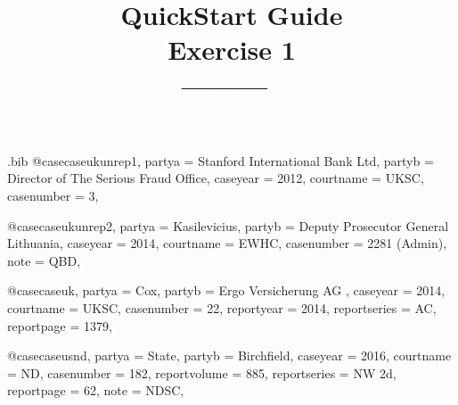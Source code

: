 \begin{filecontents*}[overwrite]{\jobname.bib}
@case{caseukunrep1,
  partya = {Stanford International Bank Ltd}, 
  partyb = {Director of The Serious Fraud Office},
  caseyear = {2012},
  courtname = {UKSC},
  casenumber = {3},
	}

@case{caseukunrep2,
  partya = {Kasilevicius}, 
  partyb = {Deputy Prosecutor General Lithuania},
  caseyear = {2014},
  courtname = {EWHC},
  casenumber = {2281 (Admin)},
	note = {QBD},
	}



@case{caseuk,
  partya = {Cox}, 
  partyb = {Ergo Versicherung AG },
  caseyear = {2014},
  courtname = {UKSC},
  casenumber = {22},
  reportyear = {2014},
  reportseries = {AC},
  reportpage = {1379},
	}



@case{caseusnd,
  partya = {State}, 
  partyb = {Birchfield},
  caseyear = {2016},
  courtname = {ND},
  casenumber = {182},
  reportvolume = {885},
  reportseries = {NW 2d},
  reportpage = {62},
  note = {NDSC},
	}



\end{filecontents*}

\documentclass[12pt]{article}
\title{QuickStart Guide \\Exercise 1\\[24pt]\normalsize \hfill ---------\hfill\ }
\author{}
\date{}
\newcommand\rulesep{\rule{0.4\textwidth}{.4pt}}
\usepackage[table]{xcolor}
\usepackage{fontspec}
\setmainfont{Noto Serif}
\setsansfont{Noto Sans}[Scale=0.9]
\setmonofont{Noto Sans Mono}[Colour=blue]
\newfontface{}
\newcommand\goodoh{{\large\ftmark 🗸}}
\newcommand\notsogoodoh{{\large\ftmark 🗶}}

\usepackage{splitidx}

\newcommand\bef[1]{(\textit{#1})}
\newcommand\cef[1]{\textit{#1}}
\newcommand\cmd[1]{\textsf{\textbackslash\textbf{#1}}}
\newcommand\cmdb[2]{\textsf{\textbackslash\textbf{#1}\{#2\}}}

\usepackage[style=lawcite,
	print-toc-tos=true,
	use-toc-parnumrefs=false,
	ibidtracker=false,%
	]{biblatex}


